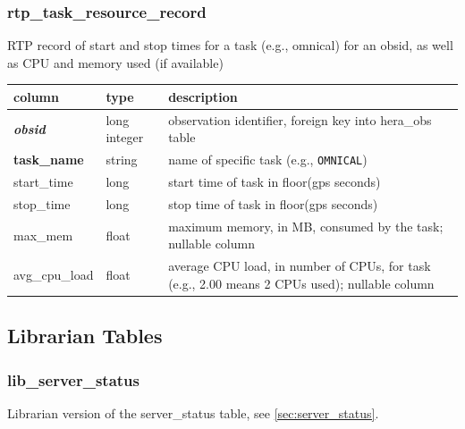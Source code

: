 \documentclass{article}
\begin{document}
\subsubsection{rtp\_task\_resource\_record}
RTP record of start and stop times for a task (e.g., omnical) for an obsid, as well as CPU and memory used (if available)
\begin{center}
  \begin{tabular}{| p{4cm} | p{2cm} | p{10cm} |}
\hline
 column & type & description \\ [0.5ex] \hline\hline
\textit{\textbf{obsid}} & long integer & observation identifier, foreign key into hera\_obs table \\ \hline
\textbf{task\_name} & string & name of specific task (e.g., \verb+OMNICAL+) \\ \hline
start\_time & long & start time of task in floor(gps seconds) \\ \hline
stop\_time & long & stop time of task in floor(gps seconds) \\ \hline
max\_mem & float & maximum memory, in MB, consumed by the task; nullable column \\ \hline
avg\_cpu\_load & float & average CPU load, in number of CPUs, for task (e.g., 2.00 means 2 CPUs used); nullable column \\ \hline
\end{tabular}
\end{center}




\subsection{Librarian Tables}
\subsubsection{lib\_server\_status}
Librarian version of the server\_status table, see \ref{sec:server_status}.
\end{document}
